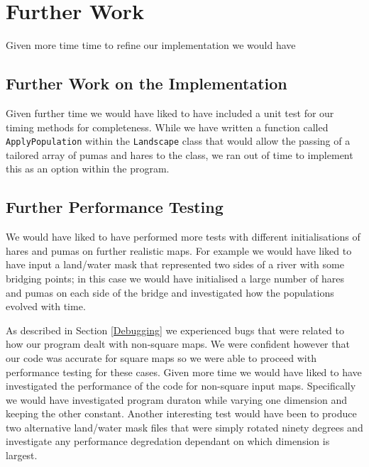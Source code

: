 \section{Further Work}
\label{Further Work}

Given more time time to refine our implementation we would have 

\subsection{Further Work on the Implementation}
Given further time we would have liked to have included a unit test for our timing methods for completeness.
While we have written a function called \texttt{ApplyPopulation} within the \texttt{Landscape} class that would allow the passing of a tailored array of pumas and hares to the class, we ran out of time to implement this as an option within the program. 

\subsection{Further Performance Testing}

We would have liked to have performed more tests with different initialisations of hares and pumas on further realistic maps. For example we would have liked to have input a land/water mask that represented two sides of a river with some bridging points; in this case we would have initialised a large number of hares and pumas on each side of the bridge and investigated how the populations evolved with time.   

As described in Section \ref{Debugging} we experienced bugs that were related to how our program dealt with non-square maps. We were confident however that our code was accurate for square maps so we were able to proceed with performance testing for these cases. 
Given more time we would have liked to have investigated the performance of the code for non-square input maps.
Specifically we would have investigated program duraton while varying one dimension and keeping the other constant. Another interesting test would have been to produce two alternative land/water mask files that were simply rotated ninety degrees and investigate any performance degredation dependant on which dimension is largest. 



 
